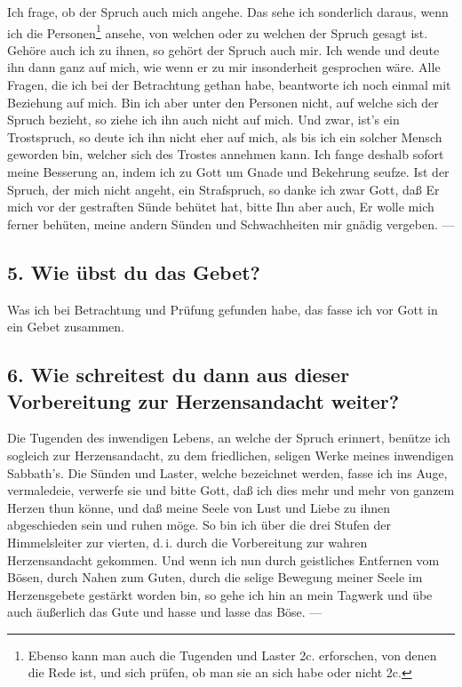 Ich frage, ob der Spruch auch mich angehe. Das sehe ich sonderlich daraus, wenn ich die Personen\footnote{Ebenso kann man auch die Tugenden und Laster 2c. erforschen, von denen die Rede ist, und sich prüfen, ob man sie an sich habe oder nicht 2c.} ansehe, von
welchen oder zu welchen der Spruch gesagt ist. Gehöre auch ich zu ihnen, so gehört der Spruch auch mir. Ich wende und deute ihn dann ganz auf mich, wie wenn er zu mir insonderheit gesprochen wäre. Alle Fragen, die ich bei der Betrachtung gethan habe, beantworte ich noch einmal mit Beziehung auf mich. Bin ich aber unter den Personen nicht, auf welche sich der Spruch bezieht, so ziehe ich ihn auch nicht auf mich. Und zwar, ist’s ein Trostspruch, so deute ich ihn nicht eher auf mich, als bis ich ein solcher Mensch geworden bin, welcher sich des Trostes annehmen kann. Ich fange deshalb sofort meine Besserung an, indem ich zu Gott um Gnade und Bekehrung seufze. Ist der Spruch, der mich nicht angeht, ein Strafspruch, so danke ich zwar Gott, daß Er mich vor der gestraften Sünde behütet hat, bitte Ihn aber auch, Er wolle mich ferner behüten, meine andern Sünden und Schwachheiten mir gnädig vergeben. —

\subsection{5. Wie übst du das Gebet?}

Was ich bei Betrachtung und Prüfung gefunden habe, das fasse ich vor Gott in ein Gebet zusammen.

\subsection[6. Wie schreitest du zur Herzensandacht?]{6. Wie schreitest du dann aus dieser Vorbereitung zur Herzensandacht weiter?}

Die Tugenden des inwendigen Lebens, an welche der Spruch erinnert, benütze ich sogleich zur Herzensandacht, zu dem friedlichen, seligen Werke meines inwendigen Sabbath’s. Die Sünden und Laster, welche bezeichnet werden, fasse ich ins Auge, vermaledeie, verwerfe sie und bitte Gott, daß ich dies mehr und mehr von ganzem Herzen thun könne, und daß meine Seele von Lust und Liebe zu ihnen abgeschieden sein und ruhen möge. So bin ich über die drei Stufen der Himmelsleiter zur vierten, d.\,i. durch die Vorbereitung zur wahren Herzensandacht gekommen. Und wenn ich nun durch geistliches Entfernen vom Bösen, durch Nahen zum Guten, durch die selige Bewegung meiner Seele im Herzensgebete gestärkt
worden bin, so gehe ich hin an mein Tagwerk und übe auch äußerlich das Gute und hasse und lasse das Böse. —

